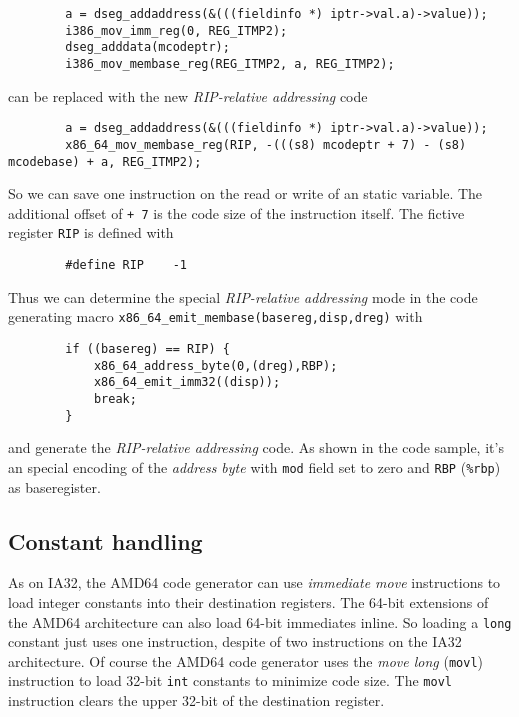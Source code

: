 \begin{verbatim}
        a = dseg_addaddress(&(((fieldinfo *) iptr->val.a)->value));
        i386_mov_imm_reg(0, REG_ITMP2);
        dseg_adddata(mcodeptr);
        i386_mov_membase_reg(REG_ITMP2, a, REG_ITMP2);
\end{verbatim}

can be replaced with the new \textit{RIP-relative addressing} code

\begin{verbatim}
        a = dseg_addaddress(&(((fieldinfo *) iptr->val.a)->value));
        x86_64_mov_membase_reg(RIP, -(((s8) mcodeptr + 7) - (s8) mcodebase) + a, REG_ITMP2);
\end{verbatim}

So we can save one instruction on the read or write of an static
variable. The additional offset of \texttt{+ 7} is the code size of
the instruction itself. The fictive register \texttt{RIP} is defined
with

\begin{verbatim}
        #define RIP    -1
\end{verbatim}

Thus we can determine the special \textit{RIP-relative addressing}
mode in the code generating macro
\texttt{x86\_64\_emit\_membase(basereg,disp,dreg)} with

\begin{verbatim}
        if ((basereg) == RIP) {
            x86_64_address_byte(0,(dreg),RBP);
            x86_64_emit_imm32((disp));
            break;
        }
\end{verbatim}

and generate the \textit{RIP-relative addressing} code. As shown in
the code sample, it's an special encoding of the \textit{address byte}
with \texttt{mod} field set to zero and \texttt{RBP} (\texttt{\%rbp})
as baseregister.


\subsection{Constant handling}

As on IA32, the AMD64 code generator can use \textit{immediate move}
instructions to load integer constants into their destination
registers. The 64-bit extensions of the AMD64 architecture can also
load 64-bit immediates inline. So loading a \texttt{long} constant
just uses one instruction, despite of two instructions on the IA32
architecture. Of course the AMD64 code generator uses the \textit{move
long} (\texttt{movl}) instruction to load 32-bit \texttt{int}
constants to minimize code size. The \texttt{movl} instruction clears
the upper 32-bit of the destination register.

